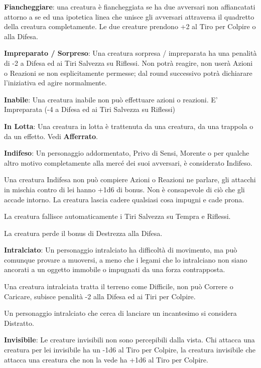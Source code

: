 \begin{multicols}{2}
\textbf{Fiancheggiare}: una creatura è fiancheggiata se ha due avversari non affiancatati attorno a se ed una ipotetica linea che unisce gli avversari attraversa il quadretto della creatura completamente. Le due creature prendono +2 al Tiro per Colpire o alla Difesa.

\textbf{Impreparato / Sorpreso}\label{impreparato}:
Una creatura sorpresa / impreparata ha una penalità di -2 a Difesa ed ai Tiri Salvezza su Riflessi. Non potrà reagire, non userà Azioni o Reazioni se non esplicitamente permesse; dal round successivo potrà dichiarare l'iniziativa ed agire normalmente.

\textbf{Inabile}: Una creatura inabile non può effettuare azioni o reazioni. E' Impreparata (-4 a Difesa ed ai Tiri Salvezza su Riflessi)

\textbf{In Lotta}: Una creatura in lotta è trattenuta da una creatura, da una trappola o da un effetto. Vedi \textbf{Afferrato}.

\textbf{Indifeso}:\hypertarget{indifeso}{}\hypertarget{morente}{}\label{morente} Un personaggio addormentato, Privo di Sensi, Morente o per qualche altro motivo completamente alla mercé dei suoi avversari, è considerato Indifeso.

Una creatura Indifesa non può compiere Azioni o Reazioni ne parlare, gli attacchi in mischia contro di lei hanno +1d6 di bonus. Non è consapevole di ciò che gli accade intorno. La creatura lascia cadere qualsiasi cosa impugni e cade prona.

La creatura fallisce automaticamente i Tiri Salvezza su Tempra e Riflessi.

La creatura perde il bonus di Destrezza alla Difesa.

\textbf{Intralciato}:\hypertarget{intralciato}{}\label{intralciato} Un personaggio intralciato ha difficoltà di movimento, ma può comunque provare a muoversi, a meno che i legami che lo intralciano non siano ancorati a un oggetto immobile o impugnati da una forza contrapposta.

Una creatura intralciata tratta il terreno come Difficile, non può Correre o Caricare, subisce penalità -2 alla Difesa ed ai Tiri per Colpire.

Un personaggio intralciato che cerca di lanciare un incantesimo si considera Distratto.

\textbf{Invisibile}: Le creature invisibili non sono percepibili dalla vista.
Chi attacca una creatura per lei invisibile ha un -1d6 al Tiro per Colpire, la creatura invisibile che attacca una creatura che non la vede ha +1d6 al Tiro per Colpire.


\end{multicols}
